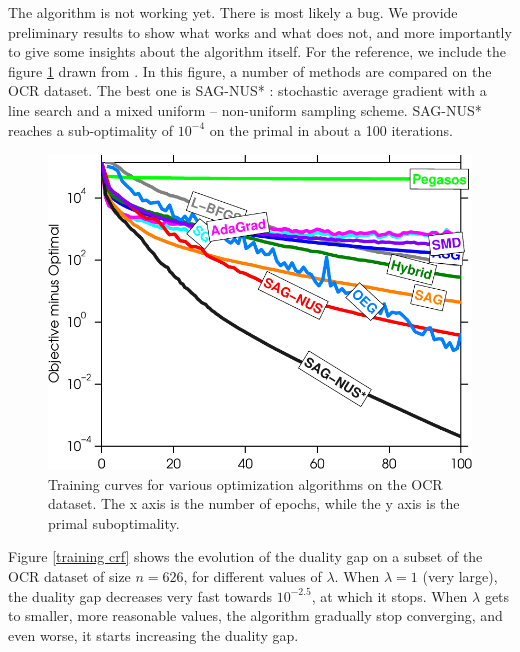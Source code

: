 \documentclass{article}
\DeclareMathOperator{\1}{\mathbb{1}}
\begin{document}
The algorithm is not working yet.
There is most likely a bug.
We provide preliminary results to show what works and what does not, and more importantly to give some insights about the algorithm itself. 
For the reference, we include the figure \ref{schmidt's curves} drawn from \cite{schmidt_non-uniform_2015}.
In this figure, a number of methods are compared on the OCR dataset.
The best one is SAG-NUS* : stochastic average gradient with a line search and a mixed uniform -- non-uniform sampling scheme.
SAG-NUS* reaches a sub-optimality of $10^{-4}$ on the primal in about a 100 iterations.

\begin{figure}[ht]
	\center
	\includegraphics[width=.5\textwidth]{images/ocr2_train_passes.pdf}
	\caption{Training curves for various optimization algorithms on the OCR dataset. The x axis is the number of epochs, while the y axis is the primal suboptimality.}
	\label{schmidt's curves}
\end{figure}


Figure \ref{training crf} shows the evolution of the duality gap on a subset  of  the OCR dataset  of size $n=626$, for different values of $\lambda$.
When $\lambda=1$ (very large), the duality gap decreases very fast towards $10^{-2.5}$, at which it stops.
When $\lambda$ gets to smaller, more reasonable values, the algorithm gradually stop converging, and even worse, it starts increasing the duality gap.
\end{document}
